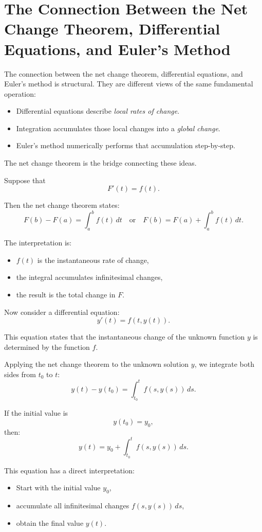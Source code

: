 \section{The Connection Between the Net Change Theorem, Differential Equations, and Euler's Method}

The connection between the net change theorem, differential equations, and Euler's method is structural. They are different views of the same fundamental operation:

\begin{itemize}
  \item Differential equations describe \emph{local rates of change}.
  \item Integration accumulates those local changes into a \emph{global change}.
  \item Euler's method numerically performs that accumulation step-by-step.
\end{itemize}

The net change theorem is the bridge connecting these ideas.

Suppose that
\[ F'(t)=f(t). \]

Then the net change theorem states:
\[ F(b)-F(a)=\int_{a}^{b} f(t)\,dt \quad \text{or}\quad F(b)=F(a)+\int_{a}^{b} f(t)\,dt. \]

The interpretation is:

\begin{itemize}
  \item \(f(t)\) is the instantaneous rate of change,
  \item the integral accumulates infinitesimal changes,
  \item the result is the total change in \(F\).
\end{itemize}

Now consider a differential equation:
\[ y'(t)=f(t,y(t)). \]

This equation states that the instantaneous change of the unknown function \(y\) is determined by the function \(f\).

Applying the net change theorem to the unknown solution \(y\), we integrate both sides from \(t_{0}\) to \(t\):
\[ y(t)-y(t_{0})=\int_{t_{0}}^{t} f(s,y(s))\,ds. \]

If the initial value is
\[ y(t_{0})=y_{0}, \]
then:
\[ y(t)=y_{0}+\int_{t_{0}}^{t} f(s,y(s))\,ds. \]

This equation has a direct interpretation:

\begin{itemize}
  \item Start with the initial value \(y_{0}\),
  \item accumulate all infinitesimal changes \(f(s,y(s))\,ds\),
  \item obtain the final value \(y(t)\).
\end{itemize}

